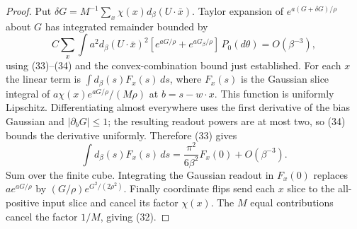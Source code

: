 \documentclass[11pt]{article}
\begin{document}
\begin{proof}
Put $\delta G=M^{-1}\sum_x\chi(x)d_\beta(U\cdot\bar x)$.
Taylor expansion of $e^{a(G+\delta G)/\rho}$ about $G$ has integrated
remainder bounded by
\[
 C\sum_x\int a^2d_\beta(U\cdot\bar x)^2
           [e^{aG/\rho}+e^{aG_\beta/\rho}]\,P_0(d\theta)
                                                    =O(\beta^{-3}),
\]
using (33)--(34) and the convex-combination bound just established.
For each $x$ the linear term is
$\int d_\beta(s)F_x(s)\,ds$, where $F_x(s)$ is the Gaussian slice
integral of $a\chi(x)e^{aG/\rho}/(M\rho)$ at $b=s-w\cdot x$.
This function is uniformly Lipschitz. Differentiating almost everywhere
uses the first derivative of the bias Gaussian and
$|\partial_bG|\le1$; the resulting readout powers are at most two,
so (34) bounds the derivative uniformly. Therefore (33) gives
\[
       \int d_\beta(s)F_x(s)\,ds
                =\frac{\pi^2}{6\beta^2}F_x(0)+O(\beta^{-3}).
\]
Sum over the finite cube. Integrating the Gaussian readout in $F_x(0)$
replaces $a e^{aG/\rho}$ by $(G/\rho)e^{G^2/(2\rho^2)}$.
Finally coordinate flips send each $x$ slice to the all-positive input
slice and cancel its factor $\chi(x)$. The $M$ equal contributions
cancel the factor $1/M$, giving (32).
\end{proof}
\end{document}
